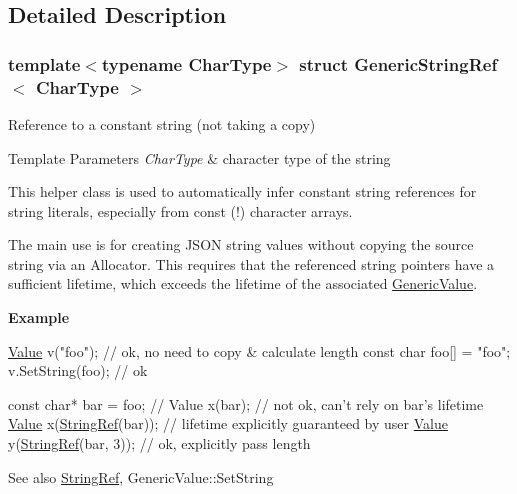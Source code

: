 \subsection{Detailed Description}
\subsubsection*{template$<$typename Char\+Type$>$\newline
struct Generic\+String\+Ref$<$ Char\+Type $>$}

Reference to a constant string (not taking a copy) 


\begin{DoxyTemplParams}{Template Parameters}
{\em Char\+Type} & character type of the string\\
\hline
\end{DoxyTemplParams}
This helper class is used to automatically infer constant string references for string literals, especially from {\ttfamily const} {\bfseries }(!) character arrays.

The main use is for creating J\+S\+ON string values without copying the source string via an Allocator. This requires that the referenced string pointers have a sufficient lifetime, which exceeds the lifetime of the associated \hyperlink{class_generic_value}{Generic\+Value}.

{\bfseries Example} 
\begin{DoxyCode}
\hyperlink{class_generic_value}{Value} v(\textcolor{stringliteral}{"foo"});   \textcolor{comment}{// ok, no need to copy & calculate length}
\textcolor{keyword}{const} \textcolor{keywordtype}{char} foo[] = \textcolor{stringliteral}{"foo"};
v.SetString(foo); \textcolor{comment}{// ok}

\textcolor{keyword}{const} \textcolor{keywordtype}{char}* bar = foo;
\textcolor{comment}{// Value x(bar); // not ok, can't rely on bar's lifetime}
\hyperlink{class_generic_value}{Value} x(\hyperlink{struct_generic_string_ref_aa6b9fd9f6aa49405a574c362ba9af6b5}{StringRef}(bar)); \textcolor{comment}{// lifetime explicitly guaranteed by user}
\hyperlink{class_generic_value}{Value} y(\hyperlink{struct_generic_string_ref_aa6b9fd9f6aa49405a574c362ba9af6b5}{StringRef}(bar, 3));  \textcolor{comment}{// ok, explicitly pass length}
\end{DoxyCode}


\begin{DoxySeeAlso}{See also}
\hyperlink{struct_generic_string_ref_aa6b9fd9f6aa49405a574c362ba9af6b5}{String\+Ref}, Generic\+Value\+::\+Set\+String 
\end{DoxySeeAlso}


